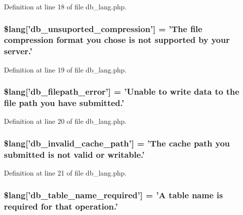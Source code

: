 Definition at line 18 of file db\-\_\-lang.\-php.

\hypertarget{db__lang_8php_a89603fd8f05ad5569670542ebc15105b}{
\subsubsection[{\$lang}]{\setlength{\rightskip}{0pt plus 5cm}\$lang\mbox{[}'db\-\_\-unsuported\-\_\-compression'\mbox{]} = 'The file compression format you chose is {\bf not} supported by your server.'}}\label{db__lang_8php_a89603fd8f05ad5569670542ebc15105b}


Definition at line 19 of file db\-\_\-lang.\-php.

\hypertarget{db__lang_8php_a0519c50a806cec99f29b499aec2582e5}{
\subsubsection[{\$lang}]{\setlength{\rightskip}{0pt plus 5cm}\$lang\mbox{[}'db\-\_\-filepath\-\_\-error'\mbox{]} = 'Unable {\bf to} {\bf write} data {\bf to} the file path you have submitted.'}}\label{db__lang_8php_a0519c50a806cec99f29b499aec2582e5}


Definition at line 20 of file db\-\_\-lang.\-php.

\hypertarget{db__lang_8php_a67157df2896b342e247ab744adf2b9e5}{
\subsubsection[{\$lang}]{\setlength{\rightskip}{0pt plus 5cm}\$lang\mbox{[}'db\-\_\-invalid\-\_\-cache\-\_\-path'\mbox{]} = 'The cache path you submitted is {\bf not} valid {\bf or} writable.'}}\label{db__lang_8php_a67157df2896b342e247ab744adf2b9e5}


Definition at line 21 of file db\-\_\-lang.\-php.

\hypertarget{db__lang_8php_a2899cf8f7246d7fa97660ea52856ade5}{
\subsubsection[{\$lang}]{\setlength{\rightskip}{0pt plus 5cm}\$lang\mbox{[}'db\-\_\-table\-\_\-name\-\_\-required'\mbox{]} = 'A table name is required {\bf for} that operation.'}}\label{db__lang_8php_a2899cf8f7246d7fa97660ea52856ade5}


